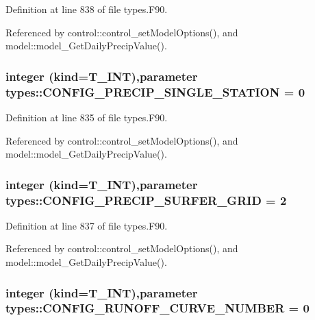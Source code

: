 Definition at line 838 of file types.F90.



Referenced by control::control\_\-setModelOptions(), and model::model\_\-GetDailyPrecipValue().

\hypertarget{namespacetypes_ac2eb7f45340cf35eb5bf1d5929b09f7f}{
\subsubsection[{CONFIG\_\-PRECIP\_\-SINGLE\_\-STATION}]{\setlength{\rightskip}{0pt plus 5cm}integer (kind={\bf T\_\-INT}),parameter {\bf types::CONFIG\_\-PRECIP\_\-SINGLE\_\-STATION} = 0}}
\label{namespacetypes_ac2eb7f45340cf35eb5bf1d5929b09f7f}


Definition at line 835 of file types.F90.



Referenced by control::control\_\-setModelOptions(), and model::model\_\-GetDailyPrecipValue().

\hypertarget{namespacetypes_abcdf72d1f81b2916cf775e1431de6b29}{
\subsubsection[{CONFIG\_\-PRECIP\_\-SURFER\_\-GRID}]{\setlength{\rightskip}{0pt plus 5cm}integer (kind={\bf T\_\-INT}),parameter {\bf types::CONFIG\_\-PRECIP\_\-SURFER\_\-GRID} = 2}}
\label{namespacetypes_abcdf72d1f81b2916cf775e1431de6b29}


Definition at line 837 of file types.F90.



Referenced by control::control\_\-setModelOptions(), and model::model\_\-GetDailyPrecipValue().

\hypertarget{namespacetypes_a13d2dc6a53c0611774f26d83189e45e1}{
\subsubsection[{CONFIG\_\-RUNOFF\_\-CURVE\_\-NUMBER}]{\setlength{\rightskip}{0pt plus 5cm}integer (kind={\bf T\_\-INT}),parameter {\bf types::CONFIG\_\-RUNOFF\_\-CURVE\_\-NUMBER} = 0}}
\label{namespacetypes_a13d2dc6a53c0611774f26d83189e45e1}


